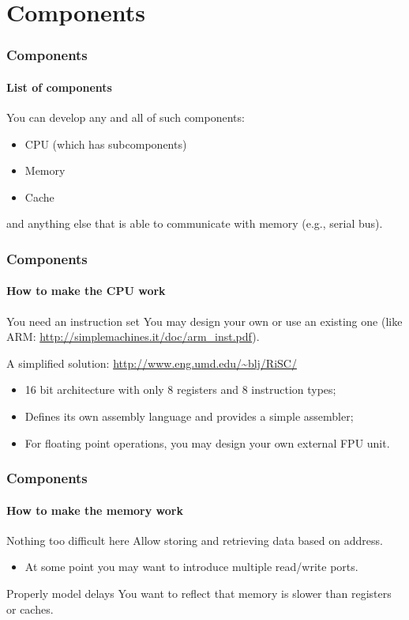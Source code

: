 \section{Components}

\begin{frame}
\frametitle{Components}
\framesubtitle{List of components}

\begin{block}{You can develop any and all of such components:}
\begin{itemize}
\item CPU (which has subcomponents)
\item Memory
\item Cache
\end{itemize}
and anything else that is able to communicate with memory (e.g., serial bus).
\end{block}
\end{frame}

\begin{frame}
\frametitle{Components}
\framesubtitle{How to make the CPU work}

\begin{block}{You need an instruction set}
You may design your own or use an existing one (like ARM: \url{http://simplemachines.it/doc/arm_inst.pdf}).
\end{block}
\pause
\begin{block}{A simplified solution: \url{http://www.eng.umd.edu/~blj/RiSC/}}
\begin{itemize}
\item 16 bit architecture with only 8 registers and 8 instruction types;
\item Defines its own assembly language and provides a simple assembler;
\item For floating point operations, you may design your own external FPU unit.
\end{itemize}
\end{block}
\end{frame}

\begin{frame}
\frametitle{Components}
\framesubtitle{How to make the memory work}

\begin{block}{Nothing too difficult here}
Allow storing and retrieving data based on address.
\begin{itemize}
\item At some point you may want to introduce multiple read/write ports.
\end{itemize}
\end{block}
\pause
\begin{block}{Properly model delays}
You want to reflect that memory is slower than registers or caches.
\end{block}
\end{frame}

